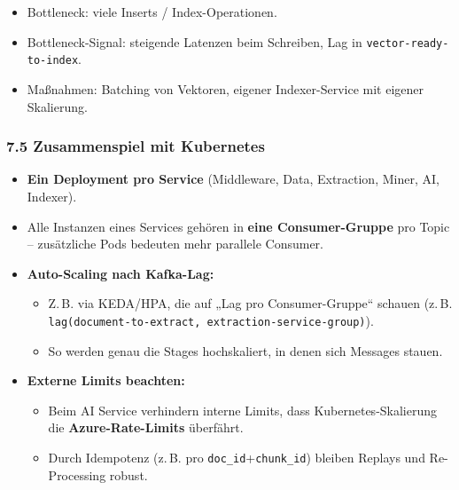 \begin{itemize}
  \begin{itemize}
  \tightlist
  \item
    Bottleneck: viele Inserts / Index-Operationen.\\
  \item
    Bottleneck-Signal: steigende Latenzen beim Schreiben, Lag in
    \texttt{vector-ready-to-index}.\\
  \item
    Maßnahmen: Batching von Vektoren, eigener Indexer-Service mit
    eigener Skalierung.
  \end{itemize}
\end{itemize}

\subsubsection{7.5 Zusammenspiel mit
Kubernetes}\label{zusammenspiel-mit-kubernetes}

\begin{itemize}
\tightlist
\item
  \textbf{Ein Deployment pro Service} (Middleware, Data, Extraction,
  Miner, AI, Indexer).\\
\item
  Alle Instanzen eines Services gehören in \textbf{eine Consumer-Gruppe}
  pro Topic -- zusätzliche Pods bedeuten mehr parallele Consumer.\\
\item
  \textbf{Auto-Scaling nach Kafka-Lag:}

  \begin{itemize}
  \tightlist
  \item
    Z.\,B. via KEDA/HPA, die auf „Lag pro Consumer-Gruppe`` schauen
    (z.\,B.
    \texttt{lag(document-to-extract,\ extraction-service-group)}).\\
  \item
    So werden genau die Stages hochskaliert, in denen sich Messages
    stauen.
  \end{itemize}
\item
  \textbf{Externe Limits beachten:}

  \begin{itemize}
  \tightlist
  \item
    Beim AI Service verhindern interne Limits, dass
    Kubernetes-Skalierung die \textbf{Azure-Rate-Limits} überfährt.\\
  \item
    Durch Idempotenz (z.\,B. pro \texttt{doc\_id}+\texttt{chunk\_id})
    bleiben Replays und Re-Processing robust.
  \end{itemize}
\end{itemize}


